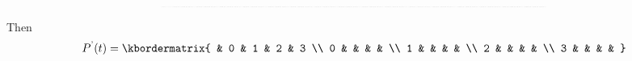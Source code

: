 \documentclass{amsart}
\theoremstyle{plain}
\theoremstyle{definition}
\begin{document}
\begin{equation*}
  \resizebox{.99\textwidth}{!}{$
    P(t)= \kbordermatrix{
    	& 0 & 1 & 2 & 3 \\
   	  0 &0 &
   	   \left(\frac{\lambda_1}{\lambda_1 + \mu_1} - \frac{\lambda_1}{\lambda_1 + \mu_1}e^{-(\lambda_1 + \mu_1)t}\right) \left(\frac{\mu_2}{\lambda_2 + \mu_2} + \frac{\lambda_2}{\lambda_2 + \mu_2}e^{-(\lambda_2 + \mu_2)t}\right)
   	  & \left(\frac{\mu_1}{\lambda_1 + \mu_1} + \frac{\lambda_1}{\lambda_1 + \mu_1}e^{-(\lambda_1 + \mu_1)      t} \right)\left(\frac{\lambda_2}{\lambda_2 + \mu_2} - \frac{\lambda_2}{\lambda_2 + \mu_2}e^{-(\lambda_2 + \mu_2)t}\right)
   	  &0  \\
       1 &  \left(\frac{\mu_1}{\lambda_1 + \mu_1} - \frac{\mu_1}{\lambda_1 + \mu_1}e^{-(\lambda_1 + \mu_1)t} \right)\left( \frac{\mu_2}{\lambda_2 + \mu_2} + \frac{\lambda_2}{\lambda_2 + \mu_2}e^{-(\lambda_2 + \mu_2)t}\right)
       & 0&0 &
		\left( \frac{\lambda_1}{\lambda_1 + \mu_1} - \frac{\lambda_1}{\lambda_1 + \mu_1}e^{-(\lambda_1 + \mu_1)t}\right)\left(\frac{\lambda_2}{\lambda_2 + \mu_2} - \frac{\mu_2}{\lambda_2 + \mu_2}e^{-(\lambda_2 + \mu_2)t}\right) \\
      	2&	 \left(\frac{\mu_1}{\lambda_1 + \mu_1} + \frac{\lambda_1}{\lambda_1 + \mu_1}e^{-(\lambda_1 + \mu_1)      t}\right)\left( \frac{\mu_2}{\lambda_2 + \mu_2} - \frac{\mu_2}{\lambda_2 + \mu_2}e^{-(\lambda_2 + \mu_2)t}\right) 
      	& 0 & 0&  \left( \frac{\lambda_1}{\lambda_1 + \mu_1} - \frac{\lambda_1}{\lambda_1 + \mu_1}e^{-(\lambda_1 + \mu_1)t}\right)\left(\frac{\lambda_2}{\lambda_2 + \mu_2} - \frac{\mu_2}{\lambda_2 + \mu_2}e^{-(\lambda_2 + \mu_2)t}\right)\\
      	3 & 0 & \left( \frac{\lambda_1}{\lambda_1 + \mu_1} - \frac{\mu_1}{\lambda_1 + \mu_1}e^{-(\lambda_1 + \mu_1      )t}\right)\left( \frac{\mu_2}{\lambda_2 + \mu_2} - \frac{\mu_2}{\lambda_2 + \mu_2}e^{-(\lambda_2 + \mu_2)t}\right)
      	&\left(\frac{\mu_1}{\lambda_1 + \mu_1} - \frac{\mu_1}{\lambda_1 + \mu_1}e^{-(\lambda_1 + \mu_1)t}\right)\left(\frac{\lambda_2}{\lambda_2 + \mu_2} - \frac{\mu_2}{\lambda_2 + \mu_2}e^{-(\lambda_2 + \mu_2)t}\right)
      	&0  \\
   }$}
\end{equation*}
Then 
\[
  P^\text{'}(t)= \kbordermatrix{
		& 0 & 1 & 2 & 3 \\
     0	& & & & \\
 	 1  & & & & \\
 	 2  & & & & \\
     3 & & & &
    }
\]
\end{document}
